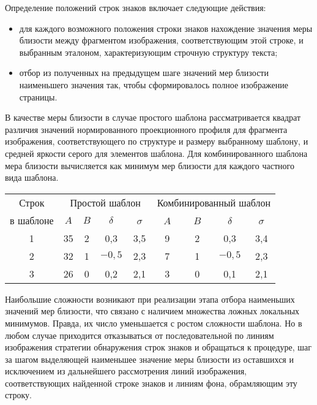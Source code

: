 \begin{multicols}{2}
      Определение положений строк знаков включает следующие действия:
      \begin{itemize}
\item для каждого возможного положения строки знаков нахождение значения меры 
близости между фрагментом изображения, соответствующим этой строке, и 
выбранным эталоном, характеризующим строчную структуру текста;
\item отбор из полученных на предыдущем шаге значений мер близости наименьшего 
значения так, чтобы сформировалось полное изображение страницы.
      \end{itemize}
      
      В качестве меры близости в случае простого шаблона рассматривается квадрат 
различия значений нормированного проекционного профиля для фрагмента изображения, 
соответствующего по структуре и размеру выбранному шаблону, и средней яркости 
серого для элементов шаблона. Для комбинированного шаблона мера близости 
вы\-чис\-ля\-ет\-ся как минимум мер близости для каждого частного вида шаблона.

 \begin{table*}\small
       \begin{center}
       \vspace*{2ex}
       
       \begin{tabular}{|c|c|c|c|c|c|c|c|c|}
       \hline
Строк &\multicolumn{4}{c|}{Простой шаблон}&\multicolumn{4}{c|}{Комбинированный 
шаблон}\\
\cline{2-9}
в шаблоне&$A$&$B$&$\delta$&\ $\sigma$\ &\ $A$\ &\ $B$\ &\ $\delta$\ &\ $\sigma$\ \\
\hline
1&35&2&0,3&3,5&9&2&0,3&3,4\\
2&32&1&$-0{,}5$\hphantom{$-$}&2,3&7&1&$-0{,}5$\hphantom{$-$}&2,3\\
3&26&0&0,2&2,1&3&0&0,1&2,1\\
\hline
\end{tabular}
\end{center}
\end{table*}

      
      Наибольшие сложности возникают при реализации этапа отбора наименьших 
значений мер близости, что связано с наличием множества ложных локальных 
минимумов. Правда, их число уменьшается с ростом сложности шаблона. Но в любом 
случае приходится отказываться от последовательной по линиям изображения стратегии 
обнаружения строк знаков и обращаться к процедуре, шаг за шагом выделяющей 
наименьшее значение меры близости из оставшихся и исключением из дальнейшего 
рассмотрения линий изображения, соответствующих найденной строке знаков и линиям 
фона, обрамляющим эту строку. 
      

\end{multicols}
